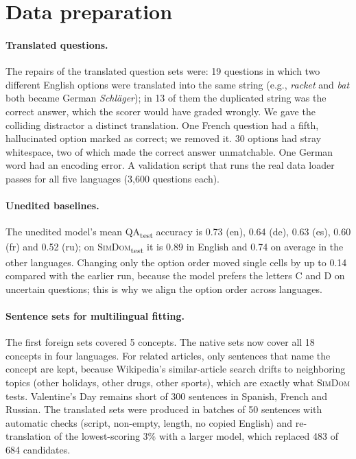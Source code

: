 \documentclass[11pt]{article}
\newcommand{\qatest}{\textsc{QA}\textsubscript{test}}
\newcommand{\simtest}{\textsc{SimDom}\textsubscript{test}}
\begin{document}
\section{Data preparation}
\label{app:data}

\paragraph{Translated questions.}
The repairs of the translated question sets were:
19 questions in which two different English options were translated into the same string (e.g., \emph{racket} and \emph{bat} both became German \emph{Schläger}); in 13 of them the duplicated string was the correct answer, which the scorer would have graded wrongly. We gave the colliding distractor a distinct translation.
One French question had a fifth, hallucinated option marked as correct; we removed it.
30 options had stray whitespace, two of which made the correct answer unmatchable.
One German word had an encoding error.
A validation script that runs the real data loader passes for all five languages (3{,}600 questions each).

\paragraph{Unedited baselines.}
The unedited model's mean \qatest{} accuracy is 0.73 (en), 0.64 (de), 0.63 (es), 0.60 (fr) and 0.52 (ru); on \simtest{} it is 0.89 in English and 0.74 on average in the other languages.
Changing only the option order moved single cells by up to 0.14 compared with the earlier run, because the model prefers the letters C and D on uncertain questions; this is why we align the option order across languages.

\paragraph{Sentence sets for multilingual fitting.}
The first foreign sets covered 5 concepts.
The native sets now cover all 18 concepts in four languages.
For related articles, only sentences that name the concept are kept, because Wikipedia's similar-article search drifts to neighboring topics (other holidays, other drugs, other sports), which are exactly what \textsc{SimDom} tests.
Valentine's Day remains short of 300 sentences in Spanish, French and Russian.
The translated sets were produced in batches of 50 sentences with automatic checks (script, non-empty, length, no copied English) and re-translation of the lowest-scoring 3\% with a larger model, which replaced 483 of 684 candidates.
\end{document}

